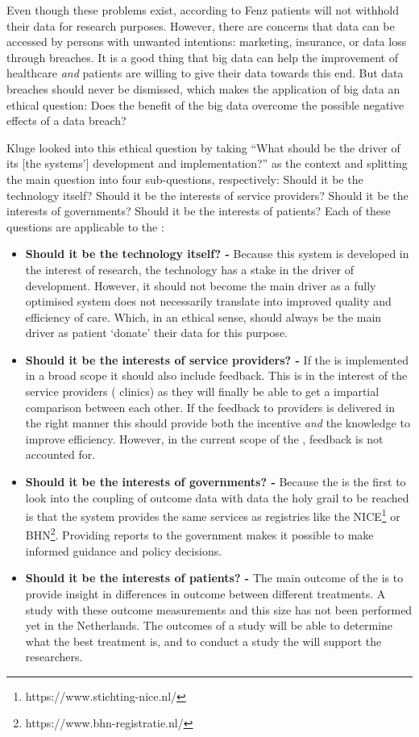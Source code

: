 Even though these problems exist, according to Fenz \cite{s15Fenz2014} patients will not withhold their data for research purposes.
However, there are concerns that data can be accessed by persons with unwanted intentions: marketing, insurance, or data loss through breaches.
It is a good thing that big data can help the improvement of healthcare \emph{and} patients are willing to give their data towards this end.
But data breaches should never be dismissed, which makes the application of big data an ethical question: Does the benefit of the big data overcome the possible negative effects of a data breach?

Kluge \cite{s7Kluge2007} looked into this ethical question by taking ``What should be the driver of its [the systems'] development and implementation?'' as the context and splitting the main question into four sub-questions, respectively: Should it be the technology itself? Should it be the interests of service providers? Should it be the interests of governments? Should it be the interests of patients?
Each of these questions are applicable to the \project{}:

\begin{itemize}
	\item \textbf{Should it be the technology itself? -} Because this system is developed in the interest of research, the technology has a stake in the driver of development.
	However, it should not become the main driver as a fully optimised system does not necessarily translate into improved quality and efficiency of care.
	Which, in an ethical sense, should always be the main driver as patient `donate' their data for this purpose.
	\item \textbf{Should it be the interests of service providers? -} If the \ivfsystem{} is implemented in a broad scope it should also include feedback.
	This is in the interest of the service providers (\ie{} clinics) as they will finally be able to get a impartial comparison between each other.
	If the feedback to providers is delivered in the right manner this should provide both the incentive \emph{and} the knowledge to improve efficiency.
	However, in the current scope of the \project{}, feedback is not accounted for.
	\item \textbf{Should it be the interests of governments? -} Because the \project{} is the first to look into the coupling of outcome data with \IVF{} data the holy grail to be reached is that the system provides the same services as registries like the NICE\footnote{https://www.stichting-nice.nl/} or BHN\footnote{https://www.bhn-registratie.nl/}.
	Providing reports to the government makes it possible to make informed guidance and policy decisions.
	\item \textbf{Should it be the interests of patients? -} The main outcome of the \project{} is to provide insight in differences in outcome between different \IVF{} treatments.
	A study with these outcome measurements and this size has not been performed yet in the Netherlands.
	The outcomes of a study will be able to determine what the best treatment is, and to conduct a study the \ivfsystem{} will support the researchers.
\end{itemize}

